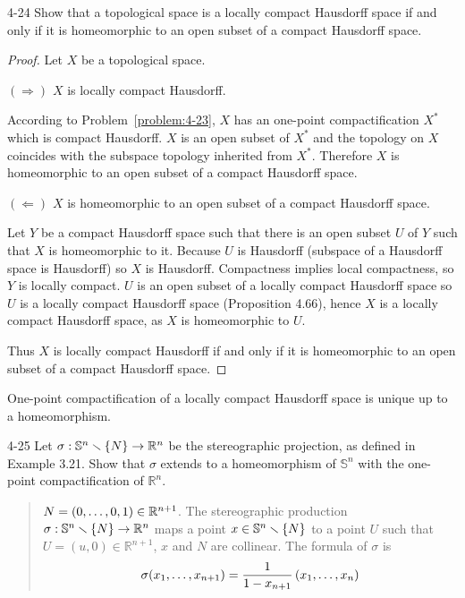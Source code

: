 \begin{problem}{4-24}\label{problem:4-24}
Show that a topological space is a locally compact Hausdorff space if and only if it is homeomorphic to an open subset of a compact Hausdorff space.
\end{problem}

\begin{proof}
	Let $X$ be a topological space.

	$(\Longrightarrow)$ $X$ is locally compact Hausdorff.

	According to Problem~\ref{problem:4-23}, $X$ has an one-point compactification $X^{*}$ which is compact Hausdorff. $X$ is an open subset of $X^{*}$ and the topology on $X$ coincides with the subspace topology inherited from $X^{*}$. Therefore $X$ is homeomorphic to an open subset of a compact Hausdorff space.

	$(\Longleftarrow)$ $X$ is homeomorphic to an open subset of a compact Hausdorff space.

	Let $Y$ be a compact Hausdorff space such that there is an open subset $U$ of $Y$ such that $X$ is homeomorphic to it. Because $U$ is Hausdorff (subspace of a Hausdorff space is Hausdorff) so $X$ is Hausdorff. Compactness implies local compactness, so $Y$ is locally compact. $U$ is an open subset of a locally compact Hausdorff space so $U$ is a locally compact Hausdorff space (Proposition 4.66), hence $X$ is a locally compact Hausdorff space, as $X$ is homeomorphic to $U$.

	Thus $X$ is locally compact Hausdorff if and only if it is homeomorphic to an open subset of a compact Hausdorff space.
\end{proof}

\begin{note}
	One-point compactification of a locally compact Hausdorff space is unique up to a homeomorphism.
\end{note}

\begin{problem}{4-25}\label{problem:4-25}
Let $\sigma: \mathbb{S}^{n}\smallsetminus\left\{{N}\right\} \to \mathbb{R}^{n}$ be the stereographic projection, as defined in Example 3.21. Show that $\sigma$ extends to a homeomorphism of $\mathbb{S}^{n}$ with the one-point compactification of $\mathbb{R}^{n}$.
\end{problem}

\begin{quotation}
	$N = \left({0, \ldots, 0, 1}\right) \in \mathbb{R}^{n+1}$. The stereographic production $\sigma: \mathbb{S}^{n}\smallsetminus\left\{{N}\right\} \to \mathbb{R}^{n}$ maps a point $x \in \mathbb{S}^{n}\smallsetminus\left\{{N}\right\}$ to a point $U$ such that $U = (u, 0)\in \mathbb{R}^{n+1}$, $x$ and $N$ are collinear. The formula of $\sigma$ is
	\begin{align*}
		\sigma(x_{1}, \ldots, x_{n+1}) = \frac{1}{1 - x_{n+1}}\left({x_{1}, \ldots, x_{n}}\right)
	\end{align*}
\end{quotation}


